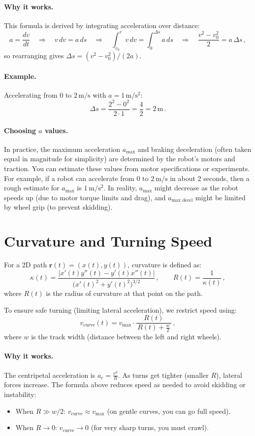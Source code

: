 \documentclass[11pt]{article}
\begin{document}
\paragraph{Why it works.} This formula is derived by integrating acceleration over distance:
\[
a = \frac{dv}{dt}
\quad\Rightarrow\quad
v\,dv = a\,ds
\quad\Rightarrow\quad
\int_{v_0}^{v} v\,dv = \int_{0}^{\Delta s} a\,ds
\quad\Rightarrow\quad
\frac{v^2 - v_0^2}{2} = a\,\Delta s\,,
\] 
so rearranging gives $\Delta s = (v^2 - v_0^2)/(2a)$.

\paragraph{Example.} Accelerating from \(0\) to \(2\,\mathrm{m/s}\) with \(a = 1\,\mathrm{m/s^2}\):
\[
\Delta s = \frac{2^2 - 0^2}{2 \cdot 1} = \frac{4}{2} = 2\,\mathrm{m}\,.
\]

\paragraph{Choosing $a$ values.} In practice, the maximum acceleration $a_{\max}$ and braking deceleration (often taken equal in magnitude for simplicity) are determined by the robot's motors and traction. You can estimate these values from motor specifications or experiments. For example, if a robot can accelerate from 0 to $2~\mathrm{m/s}$ in about $2$ seconds, then a rough estimate for $a_{\max}$ is $1~\mathrm{m/s^2}$. In reality, $a_{\max}$ might decrease as the robot speeds up (due to motor torque limits and drag), and $a_{\text{max decel}}$ might be limited by wheel grip (to prevent skidding).

\section{Curvature and Turning Speed}

For a 2D path \(\mathbf{r}(t) = (x(t), y(t))\), curvature is defined as:
\[
\kappa(t)
= \frac{|x'(t)y''(t) - y'(t)x''(t)|}
       {\big(x'(t)^2 + y'(t)^2\big)^{3/2}}\,,
\qquad
R(t) = \frac{1}{\kappa(t)}\,,
\] 
where \(R(t)\) is the radius of curvature at that point on the path.

To ensure safe turning (limiting lateral acceleration), we restrict speed using:
\[
v_{\text{curve}}(t)
= v_{\max} \cdot \frac{R(t)}{\,R(t) + \tfrac{w}{2}\,}\,,
\] 
where \(w\) is the track width (distance between the left and right wheels). 

\paragraph{Why it works.} The centripetal acceleration is \(a_c = \frac{v^2}{R}\). As turns get tighter (smaller \(R\)), lateral forces increase. The formula above reduces speed as needed to avoid skidding or instability:
\begin{itemize}
  \item When \(R \gg w/2\): \(v_{\text{curve}} \approx v_{\max}\) (on gentle curves, you can go full speed).
  \item When \(R \to 0\): \(v_{\text{curve}} \to 0\) (for very sharp turns, you must crawl).
\end{itemize}
\end{document}
